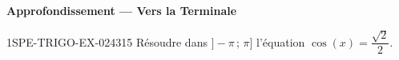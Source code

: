 \begin{center}\textbf{Approfondissement — Vers la Terminale}\end{center}
\begin{exercice}{1SPE-TRIGO-EX-024}{3}{15}
Résoudre dans $]-\pi \,;\, \pi]$ l'équation $\cos(x) = \dfrac{\sqrt{2}}{2}$.
\end{exercice}

%
